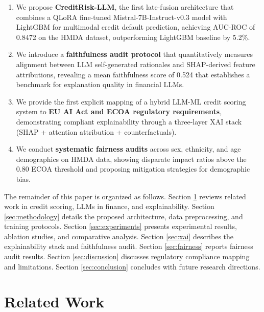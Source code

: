 \documentclass[11pt,a4paper]{article}
\begin{document}
\begin{enumerate}
    \item We propose \textbf{CreditRisk-LLM}, the first late-fusion architecture that combines a QLoRA fine-tuned Mistral-7B-Instruct-v0.3 model with LightGBM for multimodal credit default prediction, achieving AUC-ROC of 0.8472 on the HMDA dataset, outperforming LightGBM baseline by 5.2\%.
    
    \item We introduce a \textbf{faithfulness audit protocol} that quantitatively measures alignment between LLM self-generated rationales and SHAP-derived feature attributions, revealing a mean faithfulness score of 0.524 that establishes a benchmark for explanation quality in financial LLMs.
    
    \item We provide the first explicit mapping of a hybrid LLM-ML credit scoring system to \textbf{EU AI Act and ECOA regulatory requirements}, demonstrating compliant explainability through a three-layer XAI stack (SHAP + attention attribution + counterfactuals).
    
    \item We conduct \textbf{systematic fairness audits} across sex, ethnicity, and age demographics on HMDA data, showing disparate impact ratios above the 0.80 ECOA threshold and proposing mitigation strategies for demographic bias.
\end{enumerate}

The remainder of this paper is organized as follows. Section \ref{sec:related} reviews related work in credit scoring, LLMs in finance, and explainability. Section \ref{sec:methodology} details the proposed architecture, data preprocessing, and training protocols. Section \ref{sec:experiments} presents experimental results, ablation studies, and comparative analysis. Section \ref{sec:xai} describes the explainability stack and faithfulness audit. Section \ref{sec:fairness} reports fairness audit results. Section \ref{sec:discussion} discusses regulatory compliance mapping and limitations. Section \ref{sec:conclusion} concludes with future research directions.

\section{Related Work}\label{sec:related}
\end{document}
